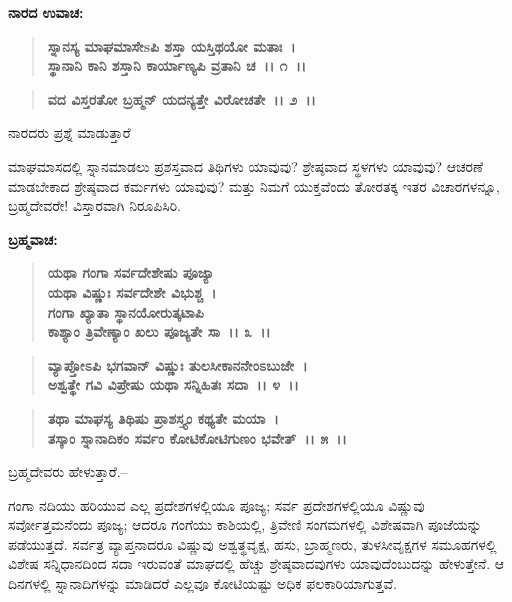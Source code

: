 \emptypage

\begin{flushleft}
\textbf{ನಾರದ ಉವಾಚ:}
\end{flushleft}

\begin{verse}
\textbf{ಸ್ನಾನಸ್ಯ ಮಾಘಮಾಸೇsಪಿ ಶಸ್ತಾ ಯಸ್ತಿಥಯೋ ಮತಾಃ~।}\\\textbf{ಸ್ಥಾನಾನಿ ಕಾನಿ ಶಸ್ತಾನಿ ಕಾರ್ಯಾಣ್ಯಪಿ ವ್ರತಾನಿ ಚ~।। ೧~।।}
\end{verse}

\begin{verse}
\textbf{ವದ ವಿಸ್ತರತೋ ಬ್ರಹ್ಮನ್ ಯದನ್ಯತ್ತೇ ವಿರೋಚತೇ~।। ೨~।।}
\end{verse}

\begin{flushleft}
ನಾರದರು ಪ್ರಶ್ನೆ ಮಾಡುತ್ತಾರೆ
\end{flushleft}

ಮಾಘಮಾಸದಲ್ಲಿ ಸ್ನಾನಮಾಡಲು ಪ್ರಶಸ್ತವಾದ ತಿಥಿಗಳು ಯಾವುವು? ಶ್ರೇಷ್ಠವಾದ ಸ್ಥಳಗಳು ಯಾವುವು? ಆಚರಣೆ ಮಾಡಬೇಕಾದ ಶ್ರೇಷ್ಠವಾದ ಕರ್ಮಗಳು ಯಾವುವು? ಮತ್ತು ನಿಮಗೆ ಯುಕ್ತವೆಂದು ತೋರತಕ್ಕ ಇತರ ವಿಚಾರಗಳನ್ನೂ, ಬ್ರಹ್ಮದೇವರೇ! ವಿಸ್ತಾರವಾಗಿ ನಿರೂಪಿಸಿರಿ.

\noindent
\textbf{ಬ್ರಹ್ಮವಾಚ:}

\begin{verse}
\textbf{ಯಥಾ ಗಂಗಾ ಸರ್ವದೇಶೇಷು ಪೂಜ್ಯಾ}\\\textbf{ಯಥಾ ವಿಷ್ಣುಃ ಸರ್ವದೇಶೇ ವಿಭುಶ್ಚ~। }\\\textbf{ಗಂಗಾ ಖ್ಯಾತಾ ಸ್ಥಾನಯೋರುತ್ಕಟಾಪಿ} \\\textbf{ಕಾಶ್ಯಾಂ ತ್ರಿವೇಣ್ಯಾಂ ಖಲು ಪೂಜ್ಯತೇ ಸಾ~।। ೩~।।}
\end{verse}

\begin{verse}
\textbf{ವ್ಯಾಪ್ತೋಽಪಿ ಭಗವಾನ್ ವಿಷ್ಣುಃ ತುಲಸೀಕಾನನೇಂಽಬುಜೇ~।}\\\textbf{ಅಶ್ವತ್ಥೇ ಗವಿ ವಿಪ್ರೇಷು ಯಥಾ ಸನ್ನಿಹಿತಃ ಸದಾ~।। ೪~।।}
\end{verse}

\begin{verse}
\textbf{ತಥಾ ಮಾಘಸ್ಯ ತಿಥಿಷು ಪ್ರಾಶಸ್ತ್ಯಂ ಕಥ್ಯತೇ ಮಯಾ~।}\\\textbf{ತಸ್ಕಾಂ ಸ್ನಾನಾದಿಕಂ ಸರ್ವಂ ಕೋಟಿಕೋಟಿಗುಣಂ ಭವೇತ್~।। ೫~।।}
\end{verse}

\begin{flushleft}
ಬ್ರಹ್ಮದೇವರು ಹೇಳುತ್ತಾರೆ.–
\end{flushleft}

ಗಂಗಾ ನದಿಯು ಹರಿಯುವ ಎಲ್ಲ ಪ್ರದೇಶಗಳಲ್ಲಿಯೂ ಪೂಜ್ಯ; ಸರ್ವ ಪ್ರದೇಶಗಳಲ್ಲಿಯೂ ವಿಷ್ಣುವು ಸರ್ವೋತ್ತಮನೆಂದು ಪೂಜ್ಯ; ಆದರೂ ಗಂಗೆಯು ಕಾಶಿಯಲ್ಲಿ, ತ್ರಿವೇಣಿ ಸಂಗಮಗಳಲ್ಲಿ ವಿಶೇಷವಾಗಿ ಪೂಜೆಯನ್ನು ಪಡೆಯುತ್ತದೆ. ಸರ್ವತ್ರ ವ್ಯಾಪ್ತನಾದರೂ ವಿಷ್ಣುವು ಅಶ್ವತ್ಥವೃಕ್ಷ, ಹಸು, ಬ್ರಾಹ್ಮಣರು, ತುಳಸೀವೃಕ್ಷಗಳ ಸಮೂಹಗಳಲ್ಲಿ ವಿಶೇಷ ಸನ್ನಿಧಾನದಿಂದ ಸದಾ ಇರುವಂತೆ ಮಾಘದಲ್ಲಿ ಹೆಚ್ಚು ಶ್ರೇಷ್ಠವಾದವುಗಳು ಯಾವುದೆಂಬುದನ್ನು ಹೇಳುತ್ತೇನೆ. ಆ ದಿನಗಳಲ್ಲಿ ಸ್ನಾನಾದಿಗಳನ್ನು ಮಾಡಿದರೆ ಎಲ್ಲವೂ ಕೋಟಿಯಷ್ಟು ಅಧಿಕ ಫಲಕಾರಿಯಾಗುತ್ತವೆ.

